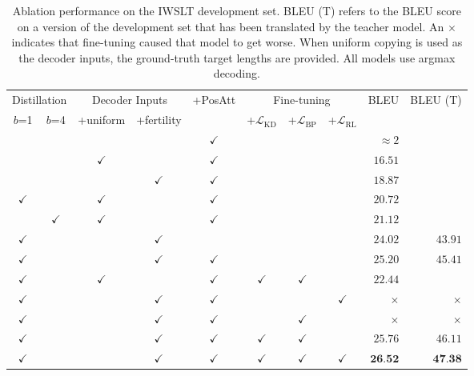 \documentclass{article} %
\begin{document}
\begin{table}[h!]
\small\centering
\begin{tabular}{cc|ccc|ccc|rr}
\toprule
\multicolumn{2}{c|}{Distillation}  & 
\multicolumn{2}{c}{Decoder Inputs} & 
\multirow{2}[2]{*}{+PosAtt}  & 
\multicolumn{3}{|c|}{Fine-tuning} & 
\multirow{2}[2]{*}{BLEU} & 
\multirow{2}[2]{*}{BLEU (T)}\\
           
$b$=1 &
$b$=4 &
+uniform & 
\multicolumn{1}{c}{+fertility} 
& 
& 
\multicolumn{1}{|c}{+$\mathcal{L}_\text{KD}$}  & 
+$\mathcal{L}_\text{BP}$ & 
+$\mathcal{L}_\text{RL}$ &   &\\

\midrule 
& &              &              & $\checkmark$  & & & & $\approx 2$ \\
& & $\checkmark$ &              & $\checkmark$  & & & & $16.51$\\
& &              & $\checkmark$ & $\checkmark$  & & & & $18.87$\\
\midrule


$\checkmark$&  & $\checkmark$ &              & $\checkmark$  & & & & $20.72$\\
&  $\checkmark$& $\checkmark$ &              & $\checkmark$  & & & & $21.12$ \\
$\checkmark$&  &              & $\checkmark$ &               & & & & $24.02$ & $43.91$ \\
$\checkmark$&  &              & $\checkmark$ & $\checkmark$  & & & & $25.20$ & $45.41$ \\
\midrule
$\checkmark$&  & $\checkmark$ &  & $\checkmark$& $\checkmark$ & $\checkmark$ & & $22.44$ \\
$\checkmark$&  &              & $\checkmark$ & $\checkmark$  & & & $\checkmark$ & $\times$ & $\times$\\
$\checkmark$&  &              & $\checkmark$ & $\checkmark$  & & $\checkmark$ & & $\times$ & $\times$\\
$\checkmark$&  &              & $\checkmark$ & $\checkmark$  & $\checkmark$ & $\checkmark$ &  & $25.76$ & $46.11$\\
$\checkmark$&  &              & $\checkmark$ & $\checkmark$  & $\checkmark$ & $\checkmark$ & $\checkmark$ & $ \textbf{26.52}$ & $\textbf{47.38}$\\
\bottomrule
\end{tabular}
\caption{Ablation performance on the IWSLT development set. BLEU (T) refers to the BLEU score on a version of the development set that has been translated by the teacher model. An $\times$ indicates that fine-tuning caused that model to get worse. When uniform copying is used as the decoder inputs, the ground-truth target lengths are provided. All models use argmax decoding.}
\end{table}
\end{document}
